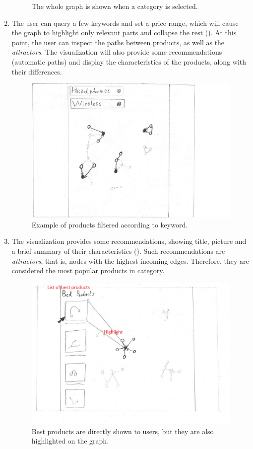 \documentclass[a4paper,12pt]{article}
\begin{document}
\begin{enumerate}
\begin{figure}[H]
		\caption{The whole graph is shown when a category is selected.}
		\label{fig:graph}
	\end{figure}
	\item The user can query a few keywords and set a price range, which will cause the graph to highlight only relevant parts and collapse the rest (). At this point, the user can inspect the paths between products, as well as the \emph{attractors}. The visualization will also provide some recommendations (automatic paths) and display the characteristics of the products, along with their differences.
		\begin{figure}[H]
		\centering{}
		\includegraphics[width=\textwidth]{img/wireless.png}
		\caption{Example of products filtered according to keyword.}
		\label{fig:wireless}
	\end{figure}
	\item The visualization provides some recommendations, showing title, picture and a brief summary of their characteristics (). Such recommendations are \textit{attractors}, that is, nodes with the highest incoming edges. Therefore, they are considered the most popular products in category.
	\begin{figure}[H]
	\centering{}
	\includegraphics[width=\textwidth]{img/best.png}
	\caption{Best products are directly shown to users, but they are also highlighted on the graph.}
	\label{fig:best}
\end{figure}
\end{enumerate}
\end{document}
